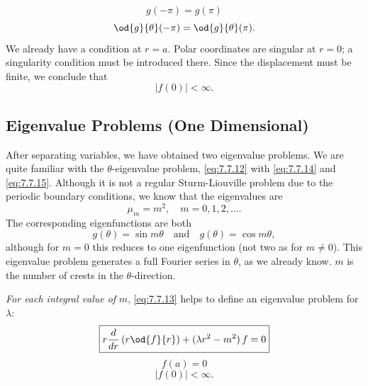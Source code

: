 \begin{equation}
g(-\pi) = g(\pi)
\label{eq:7.7.14}
\end{equation}
\begin{equation}
\od{g}{\theta}(-\pi) = \od{g}{\theta}(\pi).
\label{eq:7.7.15}
\end{equation}
We already have a condition at $r = a$.  Polar coordinates are singular at $r = 0$; a singularity condition must be introduced there.  Since the displacement must be finite, we conclude that
\begin{equation}
\boxed{|f(0)| < \infty.}
\label{eq:7.7.16}
\end{equation}

\subsection{Eigenvalue Problems (One Dimensional)}
\label{sec:7.7.3}

After separating variables, we have obtained two eigenvalue problems.  We are quite familiar with the $\theta$-eigenvalue problem, \eqref{eq:7.7.12} with \eqref{eq:7.7.14} and \eqref{eq:7.7.15}.  Although it is not a regular Sturm-Liouville problem due to the periodic boundary conditions, we know that the eigenvalues are
\begin{equation}
\mu_m = m^2, \quad m = 0, 1, 2, \ldots.
\label{eq:7.7.16b}
\end{equation}
The corresponding eigenfunctions are both
\begin{equation}
g(\theta) = \sin m\theta \quad\text{and}\quad g(\theta) = \cos m\theta,
\label{eq:7.7.17}
\end{equation}
although for $m = 0$ this reduces to one eigenfunction (not two as for $m \neq 0$).  This eigenvalue problem generates a full Fourier series in $\theta$, as we already know.  $m$ is the number of crests in the $\theta$-direction.

\emph{For each integral value of} $m$, \eqref{eq:7.7.13} helps to define an eigenvalue problem for $\lambda$:
\begin{equation}
\boxed{r\frac{d}{d r}\left(r\od{f}{r}\right) + (\lambda r^2 - m^2)\,f = 0}
\label{eq:7.7.18}
\end{equation}
\begin{equation}
\boxed{f(a) = 0}
\label{eq:7.7.19}
\end{equation}
\begin{equation}
\boxed{|f(0)| < \infty.}
\label{eq:7.7.20}
\end{equation}

